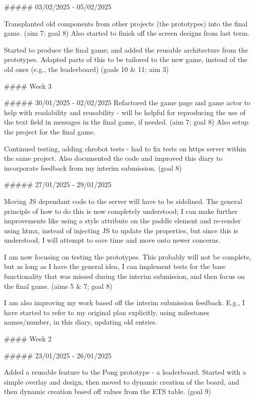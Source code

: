 \documentclass[]{final}
\begin{document}
\begin{markdown}
  ##### 03/02/2025 - 05/02/2025

  Transplanted old components from other projects (the prototypes) into the final game.
  (aim 7; goal 8) Also started to finish off the screen designs from last term.

  Started to produce the final game; and added the reusable architecture from the prototypes.
  Adapted parts of this to be tailored to the new game, instead of the old ones (e.g., the leaderboard) (goals 10 & 11; aim 3)



  #### Week 3

  ##### 30/01/2025 - 02/02/2025
  Refactored the game page and game actor to help with readability and reusability -
  will be helpful for reproducing the use of the text field in messages in the final game, if needed. (aim 7; goal 8)
  Also setup the project for the final game.

  Continued testing, adding chrobot tests - had to fix tests on https server within the same project. Also documented the code
  and improved this diary to incorporate feedback from my interim submission. (goal 8)

  ##### 27/01/2025 - 29/01/2025

  Moving JS dependant code to the server will have to be sidelined. The general
  principle of how to do this is now completely understood; I can make further improvements like using a style attribute on the paddle element and re-render using
  htmx, instead of injecting JS to update the properties, but since this is understood, I will attempt to save time and move onto newer concerns.

  I am now focusing on testing the prototypes. This probably will not be complete,
  but as long as I have the general idea, I can implement tests for the base functionality that was missed during the interim submission, and then focus on
  the final game. (aims 5 & 7; goal 8)

  I am also improving my work based off the interim submission feedback. E.g.,
  I have started to refer to my original plan explicitly, using milestones names/number,
  in this diary, updating old entries.



  #### Week 2

  ##### 23/01/2025 - 26/01/2025

  Added a reusable feature to the Pong prototype - a leaderboard. Started with a
  simple overlay and design, then moved to dynamic creation of the board, and then
  dynamic creation based off values from the ETS table. (goal 9)


\end{markdown}
\end{document}
